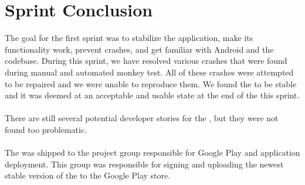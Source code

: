 
\chapter{Sprint Conclusion}
\label{cha:conclusion_sprint_1}

The goal for the first sprint was to stabilize the \launcher application, make its functionality work, prevent crashes, and get familiar with Android and the codebase. During this sprint, we have resolved various crashes that were found during manual and automated monkey test. All of these crashes were attempted to be repaired and we were unable to reproduce them. We found the \launcher to be stable and it was deemed at an acceptable and usable state at the end of the this sprint.
\\\\
There are still several potential developer stories for the \launcher, but they were not found too problematic.  
\\\\
The \launcher was shipped to the project group responsible for Google Play and application deployment. This group was responsible for signing \parencite{android_app_signing} and uploading the newest stable version of the \launcher to the Google Play store.